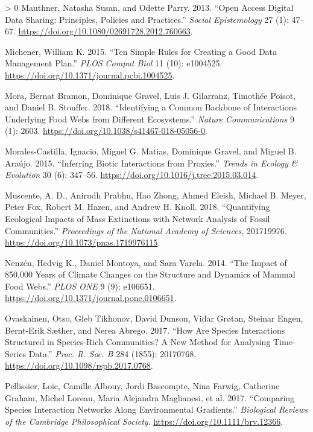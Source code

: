 \documentclass[11pt]{article}
\newlength{\cslhangindent}
\newenvironment{CSLReferences}[3] %
 {%
  \setlength{\parindent}{0pt}
  \ifodd #1 \everypar{\setlength{\hangindent}{\cslhangindent}}\ignorespaces\fi
  \ifnum #2 > 0
  \setlength{\parskip}{#2\baselineskip}
  \fi
 }%
 {}
\begin{document}
\begin{CSLReferences}{1}{0}
\leavevmode\hypertarget{ref-Mauthner2013OpeAcc}{}%
Mauthner, Natasha Susan, and Odette Parry. 2013. {``Open Access Digital
Data Sharing: Principles, Policies and Practices.''} \emph{Social
Epistemology} 27 (1): 47--67.
\url{https://doi.org/10.1080/02691728.2012.760663}.

\leavevmode\hypertarget{ref-Michener2015TenSim}{}%
Michener, William K. 2015. {``Ten Simple Rules for Creating a Good Data
Management Plan.''} \emph{PLOS Comput Biol} 11 (10): e1004525.
\url{https://doi.org/10.1371/journal.pcbi.1004525}.

\leavevmode\hypertarget{ref-Mora2018IdeCom}{}%
Mora, Bernat Bramon, Dominique Gravel, Luis J. Gilarranz, Timothée
Poisot, and Daniel B. Stouffer. 2018. {``Identifying a Common Backbone
of Interactions Underlying Food Webs from Different Ecosystems.''}
\emph{Nature Communications} 9 (1): 2603.
\url{https://doi.org/10.1038/s41467-018-05056-0}.

\leavevmode\hypertarget{ref-Morales-Castilla2015InfBio}{}%
Morales-Castilla, Ignacio, Miguel G. Matias, Dominique Gravel, and
Miguel B. Araújo. 2015. {``Inferring Biotic Interactions from
Proxies.''} \emph{Trends in Ecology \& Evolution} 30 (6): 347--56.
\url{https://doi.org/10.1016/j.tree.2015.03.014}.

\leavevmode\hypertarget{ref-Muscente2018QuaEco}{}%
Muscente, A. D., Anirudh Prabhu, Hao Zhong, Ahmed Eleish, Michael B.
Meyer, Peter Fox, Robert M. Hazen, and Andrew H. Knoll. 2018.
{``Quantifying Ecological Impacts of Mass Extinctions with Network
Analysis of Fossil Communities.''} \emph{Proceedings of the National
Academy of Sciences}, 201719976.
\url{https://doi.org/10.1073/pnas.1719976115}.

\leavevmode\hypertarget{ref-Nenzen2014Imp850}{}%
Nenzén, Hedvig K., Daniel Montoya, and Sara Varela. 2014. {``The Impact
of 850,000 Years of Climate Changes on the Structure and Dynamics of
Mammal Food Webs.''} \emph{PLOS ONE} 9 (9): e106651.
\url{https://doi.org/10.1371/journal.pone.0106651}.

\leavevmode\hypertarget{ref-Ovaskainen2017HowAre}{}%
Ovaskainen, Otso, Gleb Tikhonov, David Dunson, Vidar Grøtan, Steinar
Engen, Bernt-Erik Sæther, and Nerea Abrego. 2017. {``How Are Species
Interactions Structured in Species-Rich Communities? A New Method for
Analysing Time-Series Data.''} \emph{Proc. R. Soc. B} 284 (1855):
20170768. \url{https://doi.org/10.1098/rspb.2017.0768}.

\leavevmode\hypertarget{ref-Pellissier2017ComSpe}{}%
Pellissier, Loïc, Camille Albouy, Jordi Bascompte, Nina Farwig,
Catherine Graham, Michel Loreau, Maria Alejandra Maglianesi, et al.
2017. {``Comparing Species Interaction Networks Along Environmental
Gradients.''} \emph{Biological Reviews of the Cambridge Philosophical
Society}. \url{https://doi.org/10.1111/brv.12366}.


\end{CSLReferences}
\end{document}
